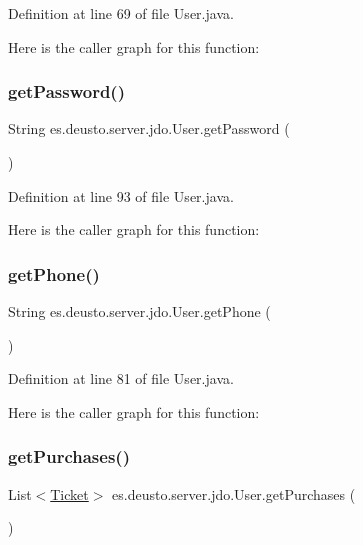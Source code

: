Definition at line 69 of file User.\+java.

Here is the caller graph for this function\+:
\mbox{\label{classes_1_1deusto_1_1server_1_1jdo_1_1_user_a1900ee126da22ed0f043e0077e8be049}} 
\subsubsection{\texorpdfstring{getPassword()}{getPassword()}}
{\footnotesize\ttfamily String es.\+deusto.\+server.\+jdo.\+User.\+get\+Password (\begin{DoxyParamCaption}{ }\end{DoxyParamCaption})}



Definition at line 93 of file User.\+java.

Here is the caller graph for this function\+:
\mbox{\label{classes_1_1deusto_1_1server_1_1jdo_1_1_user_a9ad4609fbf59521908115b9c49d903f4}} 
\subsubsection{\texorpdfstring{getPhone()}{getPhone()}}
{\footnotesize\ttfamily String es.\+deusto.\+server.\+jdo.\+User.\+get\+Phone (\begin{DoxyParamCaption}{ }\end{DoxyParamCaption})}



Definition at line 81 of file User.\+java.

Here is the caller graph for this function\+:
\mbox{\label{classes_1_1deusto_1_1server_1_1jdo_1_1_user_a320e5da31fb294ff638ff77b0c4f6de4}} 
\subsubsection{\texorpdfstring{getPurchases()}{getPurchases()}}
{\footnotesize\ttfamily List$<$\mbox{\hyperlink{classes_1_1deusto_1_1server_1_1jdo_1_1_ticket}{Ticket}}$>$ es.\+deusto.\+server.\+jdo.\+User.\+get\+Purchases (\begin{DoxyParamCaption}{ }\end{DoxyParamCaption})}



